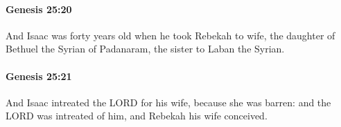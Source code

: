 		\paragraph{Genesis 25:20} %
			\label{GENESIS-25-20}

			And Isaac was forty years old when he took Rebekah to wife, the daughter of Bethuel the Syrian of Padanaram, the sister to Laban the Syrian.


		\paragraph{Genesis 25:21} %
			\label{GENESIS-25-21}

			And Isaac intreated the LORD for his wife, because she was barren: and the LORD was intreated of him, and Rebekah his wife conceived.



